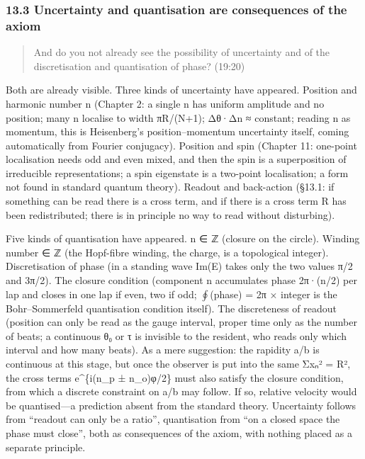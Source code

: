 \documentclass[
  a4paper,
]{article}
\begin{document}
\subsubsection{13.3 Uncertainty and quantisation are consequences of the
axiom}\label{uncertainty-and-quantisation-are-consequences-of-the-axiom}

\begin{quote}
And do you not already see the possibility of uncertainty and of the
discretisation and quantisation of phase? (19:20)
\end{quote}

Both are already visible. Three kinds of uncertainty have appeared.
Position and harmonic number n (Chapter 2: a single n has uniform
amplitude and no position; many n localise to width πR/(N+1); Δθ·Δn ≈
constant; reading n as momentum, this is Heisenberg's position--momentum
uncertainty itself, coming automatically from Fourier conjugacy).
Position and spin (Chapter 11: one-point localisation needs odd and even
mixed, and then the spin is a superposition of irreducible
representations; a spin eigenstate is a two-point localisation; a form
not found in standard quantum theory). Readout and back-action (§13.1:
if something can be read there is a cross term, and if there is a cross
term R has been redistributed; there is in principle no way to read
without disturbing).

Five kinds of quantisation have appeared. n ∈ ℤ (closure on the circle).
Winding number ∈ ℤ (the Hopf-fibre winding, the charge, is a topological
integer). Discretisation of phase (in a standing wave Im(E) takes only
the two values π/2 and 3π/2). The closure condition (component n
accumulates phase 2π·(n/2) per lap and closes in one lap if even, two if
odd; \(\oint\)(phase) = 2π × integer is the Bohr--Sommerfeld
quantisation condition itself). The discreteness of readout (position
can only be read as the gauge interval, proper time only as the number
of beats; a continuous θ₀ or τ is invisible to the resident, who reads
only which interval and how many beats). As a mere suggestion: the
rapidity a/b is continuous at this stage, but once the observer is put
into the same Σxₙ² = R², the cross terms e\^{}\{i(n\_p ± n\_o)φ/2\} must
also satisfy the closure condition, from which a discrete constraint on
a/b may follow. If so, relative velocity would be quantised---a
prediction absent from the standard theory. Uncertainty follows from
``readout can only be a ratio'', quantisation from ``on a closed space
the phase must close'', both as consequences of the axiom, with nothing
placed as a separate principle.
\end{document}
